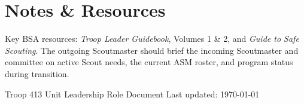 \documentclass[11pt, letterpaper]{article}
\begin{document}
\vspace{0.4em}

\section{Notes \& Resources}
Key BSA resources: \textit{Troop Leader Guidebook}, Volumes 1 \& 2, and \textit{Guide to Safe Scouting}. The outgoing Scoutmaster should brief the incoming Scoutmaster and committee on active Scout needs, the current ASM roster, and program status during transition.

\vfill
\begin{center}
  \footnotesize\color{gray}
  Troop 413 \textbullet{} Unit Leadership Role Document \textbullet{} Last updated: \today
\end{center}
\end{document}
